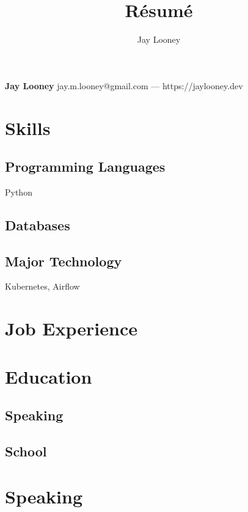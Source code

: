 \documentclass{article}
\makeatletter
\renewcommand{\maketitle}{
\begin{center}
{\huge\bfseries Jay Looney}
\vspace{.25}
jay.m.looney@gmail.com --- https://jaylooney.dev
\end{center}
}
\makeatother
\begin{document}
\title{R\'esum\'e}
\author{Jay Looney}

\maketitle

\section{Skills}

\subsection{Programming Languages}
Python
\subsection{Databases}
\subsection{Major Technology}
Kubernetes, Airflow


\section{Job Experience}
\section{Education}

\subsection{Speaking}
\subsection{School}

\section{Speaking}
\end{document}
